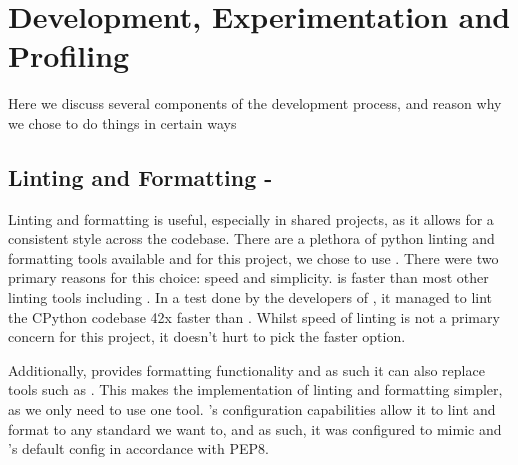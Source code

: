 
\section{Development, Experimentation and Profiling}\label{sec:development-experimentation-and-profiling}
Here we discuss several components of the development process, and reason why we chose to do things in certain ways

\subsection{Linting and Formatting - }\label{subsec:linting-and-formatting}
    Linting and formatting is useful, especially in shared projects, as it allows for a consistent style across the codebase.
    There are a plethora of python linting and formatting tools available and for this project, we chose to use .
    There were two primary reasons for this choice: speed and simplicity.
     is faster than most other linting tools including .
    In a test done by the developers of , it managed to lint the CPython codebase 42x faster than
     \cite{ruff-repo}.
    Whilst speed of linting is not a primary concern for this project, it doesn't hurt to pick the faster option.

    Additionally,  provides formatting functionality and as such it can also replace tools such as
    .
    This makes the implementation of linting and formatting simpler, as we only need to use one tool.
    's configuration capabilities allow it to lint and format to any standard we want to, and as such,
    it was configured to mimic  and 's default config in accordance with PEP8.

